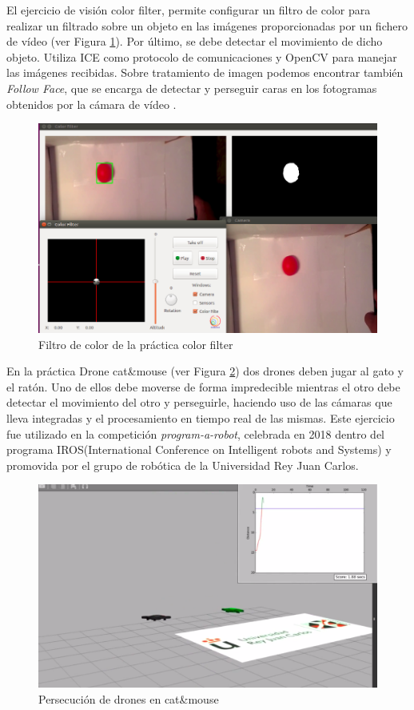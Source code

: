 \documentclass[12pt,spanish,chapterprefix, numbers=noenddot]{book}
\numberwithin{equation}{section}
\numberwithin{figure}{section}
\begin{document}
El ejercicio de visión color filter, permite configurar un filtro  de color para realizar un filtrado sobre un objeto en las imágenes proporcionadas por un fichero de vídeo (ver Figura \ref{fig:colorFilter}). Por último, se debe detectar el movimiento de dicho objeto. Utiliza ICE como protocolo de comunicaciones y OpenCV para manejar las imágenes recibidas. 
Sobre tratamiento de imagen podemos encontrar también \textit{Follow Face}, que se encarga de detectar y perseguir caras en los fotogramas obtenidos por la cámara de vídeo \cite{Carlos}. 

\begin{figure}[hbt!]
\centering
\includegraphics[width=12cm]{Figs/colorFilter.png}
\par
\caption{\label{fig:colorFilter}Filtro de color de la práctica color filter}
\end{figure}

En la práctica Drone cat\&mouse (ver Figura \ref{fig:catMouse}) dos drones deben jugar al gato y el ratón. Uno de ellos debe moverse de forma impredecible mientras el otro debe detectar el movimiento del otro y perseguirle, haciendo uso de las cámaras que lleva integradas y el procesamiento en tiempo real de las mismas. Este ejercicio fue utilizado en la competición \textit{program-a-robot}, celebrada en 2018 dentro del programa IROS(International Conference on Intelligent robots and Systems) y promovida por el grupo de robótica de la Universidad Rey Juan Carlos.

\begin{figure}[hbt!]
\centering
\includegraphics[width=12cm]{Figs/catMouse.png}
\par
\caption{\label{fig:catMouse}Persecución de drones en cat\&mouse}
\end{figure}
\end{document}
